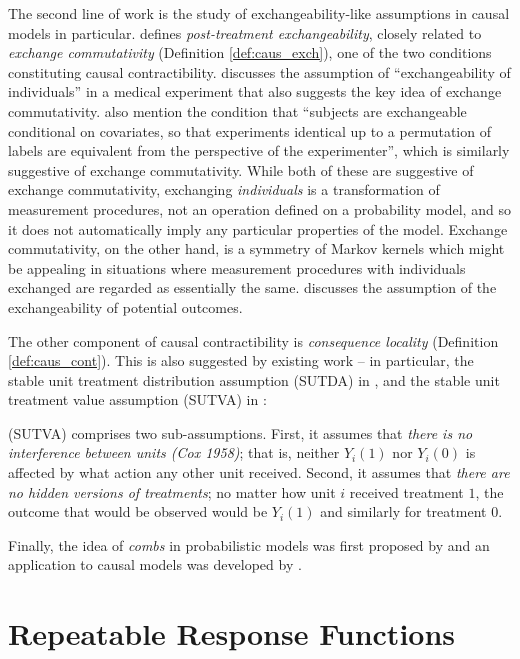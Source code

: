 The second line of work is the study of exchangeability-like assumptions in causal models in particular. \citet{dawid_decision-theoretic_2020} defines \emph{post-treatment exchangeability}, closely related to \emph{exchange commutativity} (Definition \ref{def:caus_exch}), one of the two conditions constituting causal contractibility. \citet{greenland_identifiability_1986} discusses the assumption of ``exchangeability of individuals'' in a medical experiment that also suggests the key idea of exchange commutativity. \citet{banerjee_chapter_2017} also mention the condition that ``subjects are exchangeable conditional on covariates, so that experiments identical up to a permutation of labels are equivalent from the perspective of the experimenter'', which is similarly suggestive of exchange commutativity. While both of these are suggestive of exchange commutativity, exchanging \emph{individuals} is a transformation of measurement procedures, not an operation defined on a probability model, and so it does not automatically imply any particular properties of the model. Exchange commutativity, on the other hand, is a symmetry of Markov kernels which might be appealing in situations where measurement procedures with individuals exchanged are regarded as essentially the same. \citet{rubin_causal_2005} discusses the assumption of the exchangeability of potential outcomes.

The other component of causal contractibility is \emph{consequence locality} (Definition \ref{def:caus_cont}). This is also suggested by existing work -- in particular, the stable unit treatment distribution assumption (SUTDA) in \citet{dawid_decision-theoretic_2020}, and the stable unit treatment value assumption (SUTVA) in \citep{rubin_causal_2005}:
\begin{blockquote}
(SUTVA) comprises two sub-assumptions. First, it assumes that \emph{there is no interference between units (Cox 1958)}; that is, neither $Y_i(1)$ nor $Y_i(0)$ is affected by what action any other unit received. Second, it assumes that \emph{there are no hidden versions of treatments}; no matter how unit $i$ received treatment $1$, the outcome that would be observed would be $Y_i(1)$ and similarly for treatment $0$.
\end{blockquote}

Finally, the idea of \emph{combs} in probabilistic models was first proposed by \citet{chiribella_quantum_2008} and an application to causal models was developed by \citet{jacobs_causal_2019}.

\section{Repeatable Response Functions}\label{sec:response_functions}

